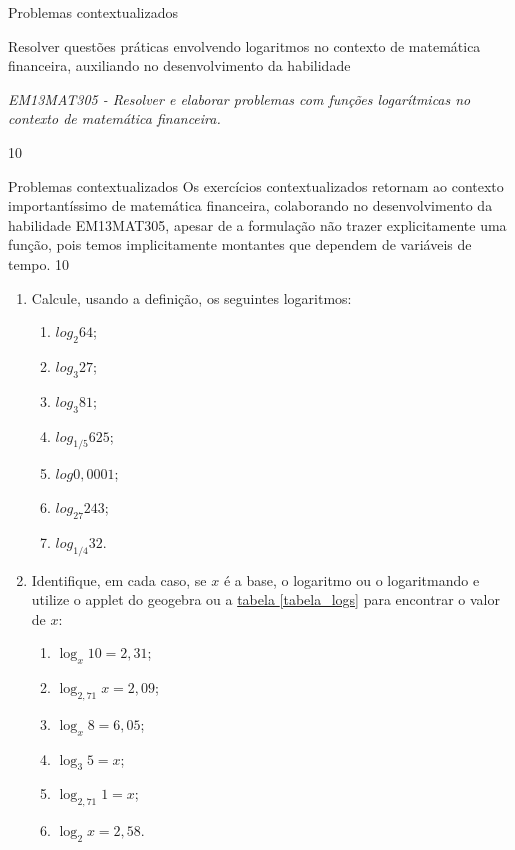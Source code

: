 \clearmargin
\begin{objectives}{Problemas contextualizados}
{
	Resolver questões práticas envolvendo logaritmos no contexto de matemática financeira, auxiliando no desenvolvimento da habilidade

	\textit{EM13MAT305 - Resolver e elaborar problemas com funções logarítmicas no contexto de matemática financeira.}
}{1}{0}
\end{objectives}
\begin{sugestions}{Problemas contextualizados}
{
	Os exercícios contextualizados retornam ao contexto importantíssimo de matemática financeira, colaborando no desenvolvimento da habilidade EM13MAT305, apesar de a formulação não trazer explicitamente uma função, pois temos implicitamente montantes que dependem de variáveis de tempo.
}{1}{0}
\end{sugestions}
\begin{enumerate}

\item {}\label{calcule}

Calcule, usando a definição, os seguintes logaritmos:
\begin{enumerate}
\item $log_2 64$;
\item $log_3 27$;
\item $log_3 81$;
\item $log_{1/5} 625$;
\item $log 0,0001$;
\item $log_{27} 243$;
\item $log_{1/4} 32$.
\end{enumerate}

\needspace{.15\textheight}
\item{}\label{identifique}

Identifique, em cada caso, se $x$ é a base, o logaritmo  ou o logaritmando e utilize o applet do geogebra ou a \hyperref[tabela_logs]{tabela \ref{tabela_logs}} para encontrar o valor de $x$:
\begin{enumerate}
\item $\log_{x} 10 = 2{,}31$;
\item $\log_{2{,}71} x = 2{,}09$;
\item $\log_x 8 = 6{,}05$;
\item $\log_3 5 =x$;
\item $\log_{2{,}71} 1= x$;
\item $\log_{2} x= 2{,}58$.
\end{enumerate}
\end{enumerate} 


